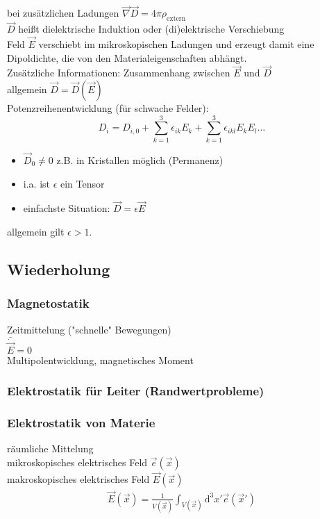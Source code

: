 \documentclass[a4paper]{article}
\begin{document}
bei zusätzlichen Ladungen $\vec{\nabla}\vec{D}=4\pi\rho_{\text{extern}}$\\
$\vec{D}$ heißt dielektrische Induktion oder (di)elektrische Verschiebung\\
Feld $\vec{E}$ verschiebt im mikroskopischen Ladungen und erzeugt damit eine
Dipoldichte, die von den Materialeigenschaften abhängt.\\
Zusätzliche Informationen: Zusammenhang zwischen $\vec{E}$ und $\vec{D}$\\
allgemein $\vec{D}=\vec{D}(\vec{E})$\\
Potenzreihenentwicklung (für schwache Felder):\\
\begin{equation}
D_i=D_{i,0}+\sum_{k=1}^3 \epsilon_{ik}E_k+\sum_{k=1}^3 \epsilon_{ikl}E_kE_l \ldots
\end{equation} 
\begin{itemize}
  \item $\vec{D}_0\neq0$ z.B. in Kristallen möglich (Permanenz)
  \item i.a. ist $\epsilon$ ein Tensor
  \item einfachste Situation: $\vec{D}=\epsilon\vec{E}$
\end{itemize}

allgemein gilt $\epsilon>1$.

\subsection{Wiederholung}
\subsubsection{Magnetostatik}
Zeitmittelung ("schnelle" Bewegungen)\\
$\bar{\dot{\vec{E}}}=0$\\
Multipolentwicklung, magnetisches Moment\\
\subsubsection{Elektrostatik für Leiter (Randwertprobleme)}
\subsubsection{Elektrostatik von Materie}
räumliche Mittelung\\
mikroskopisches elektrisches Feld $\vec{e}(\vec{x})$\\
makroskopisches elektrisches Feld $\vec{E}(\vec{x})$\\
\begin{align}
\vec{E}(\vec{x})=\frac{1}{V(\vec{x})}\int_{V(\vec{x})} \mathrm{d}^3x' \vec{e}(\vec{x}')
\end{align}
\end{document}

